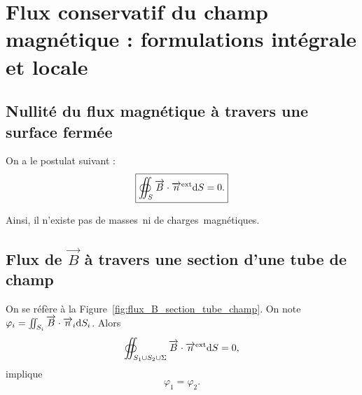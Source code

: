 \section[Flux du champ magnétique]{Flux conservatif du champ magnétique : formulations intégrale et locale}
    \subsection{Nullité du flux magnétique à travers une surface fermée}

        On a le postulat suivant :
        \begin{equation}
            \boxed{
                \oiint_{S}\protect\overrightarrow{{B}}\cdot\protect\overrightarrow{{n}}^{\text{ext}}\mathrm{d} S=0.
            }
        \end{equation}

        Ainsi, il n'existe pas de \og masses\fg~ni de \og charges\fg~magnétiques.

    \subsection{Flux de \texorpdfstring{$\vec{B}$}{B} à travers une section d'une tube de champ}

        On se réfère à la Figure~\ref{fig:flux_B_section_tube_champ}. On note $\varphi_{i}=\iint_{S_i}\protect\overrightarrow{{B}}\cdot\protect\overrightarrow{{n}}_i\mathrm{d} S_i$. Alors
        \begin{equation}
            \oiint_{S_1\cup S_2\cup\Sigma}\protect\overrightarrow{{B}}\cdot\protect\overrightarrow{{n}}^{\text{ext}}\mathrm{d} S=0,
        \end{equation}
        implique
        \begin{equation}
            \boxed{
                \varphi_1=\varphi_2.
            }
        \end{equation}

